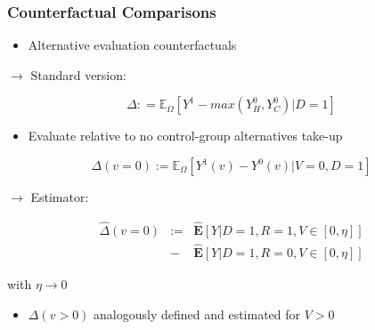\documentclass[static]{JJH-Beamer}
\begin{document}
\begin{frame}
\frametitle{Counterfactual Comparisons}
\begin{itemize}
	\item Alternative evaluation counterfactuals  \\
\end{itemize}
		$\rightarrow$ Standard version: 

\begin{equation}
\Delta : = \mathbb{E}_{\Omega} \left[ Y^1 - max \left( Y_{H}^0, Y_C^0 \right)  | D = 1\right] 
\end{equation}

\begin{itemize}
	\item Evaluate relative to no control-group alternatives take-up
\end{itemize}

\begin{equation}
\Delta \left( v = 0 \right) := \mathbb{E}_{\Omega} \left[ Y^1\left( v \right) - Y^0\left( v \right) | V = 0, D = 1 \right]
\end{equation}

$\rightarrow$ Estimator:

\begin{eqnarray}
\widehat{\Delta} \left( v = 0 \right) &:=& \widehat{\mathbf{E}} \left[ Y | D = 1, R = 1, V \in [0,  \eta] \right] \nonumber \\ 
&-& \widehat{\mathbf{E}} \left[ Y | D = 1, R = 0,  V \in [0, \eta] \right]
\end{eqnarray}

with $\eta \rightarrow 0$

\begin{itemize}
\item $\Delta \left( v > 0 \right)$ analogously defined and estimated for $V > 0$
\end{itemize}
\end{frame}
\end{document}
